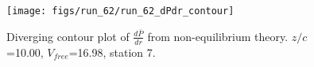 \begin{figure}[H]
\centering
\texttt{[image: figs/run\_62/run\_62\_dPdr\_contour]}
\caption{Diverging contour plot of $\frac{d\bar{P}}{dr}$ from non-equilibrium theory. $z/c$=10.00, $V_{free}$=16.98, station 7.}
\label{fig:run_62_dPdr_contour}
\end{figure}


